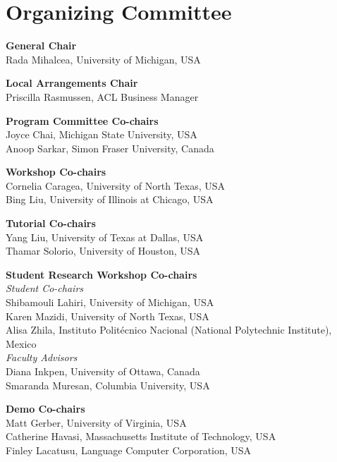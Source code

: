 \markboth{}{} %
\markright{}{} %

\section{Organizing Committee}{}

\setlength{\parindent}{0pt}

{\bf General Chair} \\
Rada Mihalcea, University of Michigan, USA

{\bf Local Arrangements Chair} \\
Priscilla Rasmussen, ACL Business Manager

{\bf Program Committee Co-chairs} \\
Joyce Chai, Michigan State University, USA \\
Anoop Sarkar, Simon Fraser University, Canada

{\bf Workshop Co-chairs} \\
Cornelia Caragea, University of North Texas, USA \\
Bing Liu, University of Illinois at Chicago, USA

{\bf Tutorial Co-chairs} \\
Yang Liu, University of Texas at Dallas, USA \\
Thamar Solorio, University of Houston, USA

{\bf Student Research Workshop Co-chairs} \\
\indent \emph{Student Co-chairs} \\
\hspace*{0.2in} Shibamouli Lahiri, University of Michigan, USA \\
\hspace*{0.2in} Karen Mazidi, University of North Texas, USA \\
\hspace*{0.2in} Alisa Zhila, Instituto Politécnico Nacional (National Polytechnic Institute), Mexico \\
\emph{Faculty Advisors} \\
\hspace*{0.2in} Diana Inkpen, University of Ottawa, Canada \\
\hspace*{0.2in} Smaranda Muresan, Columbia University, USA

{\bf Demo Co-chairs} \\
Matt Gerber, University of Virginia, USA \\
Catherine Havasi, Massachusetts Institute of Technology, USA \\
Finley Lacatusu, Language Computer Corporation, USA

